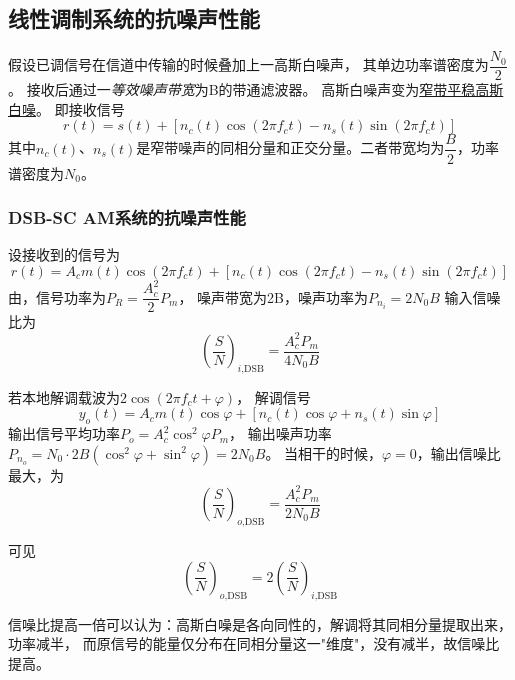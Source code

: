 \subsection{线性调制系统的抗噪声性能}
    假设已调信号在信道中传输的时候叠加上一高斯白噪声，
    其单边功率谱密度为$\dfrac{N_0}{2}$。
    接收后通过一\emph{等效噪声带宽}为B的带通滤波器。
    高斯白噪声变为\hyperref[subsubsec:BAWGN]{窄带平稳高斯白噪}。
    即接收信号
    \begin{equation}
        r(t)=s(t)+[n_c(t)\cos(2\pi f_ct)-n_s(t)\sin(2\pi f_ct)]
    \end{equation}
    其中$n_c(t)$、$n_s(t)$是窄带噪声的同相分量和正交分量。二者带宽均为$\dfrac{B}{2}$，功率谱密度为$N_0$。

    \subsubsection{DSB-SC AM系统的抗噪声性能}
    设接收到的信号为
    \begin{equation}
        r(t)=A_cm(t)\cos(2\pi f_ct)+[n_c(t)\cos(2\pi f_ct)-n_s(t)\sin(2\pi f_ct)]
    \end{equation}
    由，信号功率为$P_R=\dfrac{A_c^2}{2}P_m$，
    噪声带宽为2B，噪声功率为$P_{n_i}=2N_0B$
    输入信噪比为
    \begin{equation}
        \left(\frac{S}{N}\right)_{i\text{,DSB}}=\frac{A_c^2P_m}{4N_0B}
    \end{equation}

    若本地解调载波为$2\cos(2\pi f_ct+\varphi)$，
    解调信号
    \begin{equation}
        y_o(t)=A_cm(t)\cos\varphi+[n_c(t)\cos\varphi+n_s(t)\sin\varphi]
    \end{equation}
    输出信号平均功率$P_o=A_c^2\cos^2\varphi P_m$，
    输出噪声功率$P_{n_o}=N_0\cdot 2B(\cos^2\varphi+\sin^2\varphi)=2N_0B$。
    当相干的时候，$\varphi=0$，输出信噪比最大，为
    \begin{equation}
        \left(\frac{S}{N}\right)_{o\text{,DSB}}=\frac{A_c^2P_m}{2N_0B}
    \end{equation}

    可见
    \begin{equation}
        \left(\frac{S}{N}\right)_{o\text{,DSB}}=2\left(\frac{S}{N}\right)_{i\text{,DSB}}
    \end{equation}

    信噪比提高一倍可以认为：高斯白噪是各向同性的，解调将其同相分量提取出来，功率减半，
    而原信号的能量仅分布在同相分量这一"维度"，没有减半，故信噪比提高。


